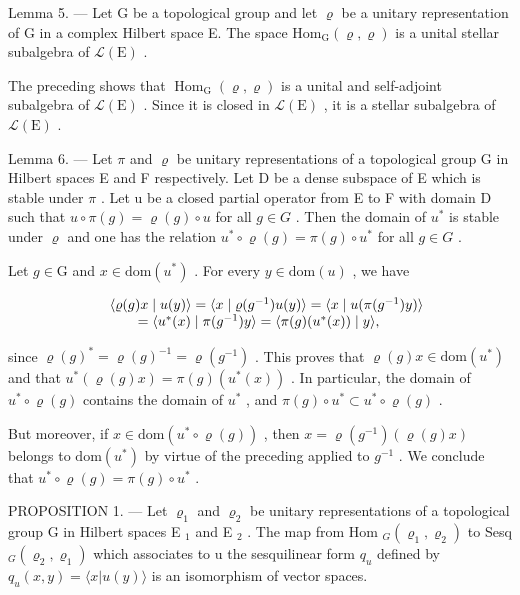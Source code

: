 Lemma 5. --- Let G be a topological group and let \(\varrho\) be a unitary representation of G in a complex Hilbert space E. The space \(\mathrm{Hom}_{\mathrm{G}}(\varrho, \varrho)\) is a unital stellar subalgebra of \(\mathcal{L}(\mathrm{E})\) .

The preceding shows that \(\operatorname{Hom}_{\mathrm{G}}(\varrho,\varrho)\) is a unital and self-adjoint subalgebra of \(\mathcal{L}(\mathrm{E})\) . Since it is closed in \(\mathcal{L}(\mathrm{E})\) , it is a stellar subalgebra of \(\mathcal{L}(\mathrm{E})\) .

Lemma 6. --- Let \(\pi\) and \(\varrho\) be unitary representations of a topological group G in Hilbert spaces E and F respectively. Let D be a dense subspace of E which is stable under \(\pi\) . Let u be a closed partial operator from E to F with domain D such that \(u \circ \pi(g) = \varrho(g) \circ u\) for all \(g \in G\) . Then the domain of \(u^{*}\) is stable under \(\varrho\) and one has the relation \(u^{*} \circ \varrho(g) = \pi(g) \circ u^{*}\) for all \(g \in G\) .

Let \(g \in \mathrm{G}\) and \(x \in \mathrm{dom}(u^*)\) . For every \(y \in \mathrm{dom}(u)\) , we have

\[
\begin{array}{r l} & {\langle \varrho (g) x \mid u (y) \rangle = \langle x \mid \varrho (g ^ {- 1}) u (y) \rangle = \langle x \mid u (\pi (g ^ {- 1}) y) \rangle} \\ & {\qquad = \langle u ^ {*} (x) \mid \pi (g ^ {- 1}) y \rangle = \langle \pi (g) (u ^ {*} (x)) \mid y \rangle ,} \end{array}
\]

since \(\varrho(g)^{*} = \varrho(g)^{-1} = \varrho(g^{-1})\) . This proves that \(\varrho(g)x \in \mathrm{dom}(u^{*})\) and that \(u^{*}(\varrho(g)x) = \pi(g)(u^{*}(x))\) . In particular, the domain of \(u^{*} \circ \varrho(g)\) contains the domain of \(u^{*}\) , and \(\pi(g) \circ u^{*} \subset u^{*} \circ \varrho(g)\) .

But moreover, if \(x \in \text{dom}(u^{*} \circ \varrho(g))\) , then \(x = \varrho(g^{-1})(\varrho(g)x)\) belongs to \(\text{dom}(u^{*})\) by virtue of the preceding applied to \(g^{-1}\) . We conclude that \(u^{*} \circ \varrho(g) = \pi(g) \circ u^{*}\) .

PROPOSITION 1. --- Let \(\varrho_{1}\) and \(\varrho_{2}\) be unitary representations of a topological group G in Hilbert spaces E \(_{1}\) and E \(_{2}\) . The map from Hom \(_{G}(\varrho_{1},\varrho_{2})\) to Sesq \(_{G}(\varrho_{2},\varrho_{1})\) which associates to u the sesquilinear form \(q_{u}\) defined by \(q_{u}(x,y)=\langle x|u(y)\rangle\) is an isomorphism of vector spaces.

